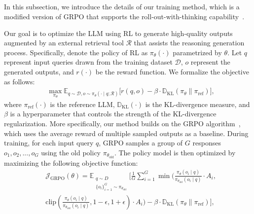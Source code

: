 \subsection{\RLName}
In this subsection, we introduce the details of our training method, which is a modified version of GRPO that supports the roll-out-with-thinking capability~\cite{song2025r1searcher}.

Our goal is to optimize the LLM using RL to generate high-quality outputs augmented by an external retrieval tool $\mathcal{R}$ that assists the reasoning generation process. Specifically, denote the policy of RL as $\pi_{\theta}(\cdot)$ parametrized by $\theta$. Let $q$ represent input queries drawn from the training dataset $\mathcal{D}$, $o$ represent the generated outputs, and $r(\cdot)$ be the reward function. We formalize the objective as follows:
\begin{equation}
\begin{aligned}
&\max_{\pi_{\theta}} \mathbb{E}_{q \sim \mathcal{D}, o \sim \pi_{\theta}(\cdot \mid q;\mathcal{R})} 
\big[ r(q,o) - 
\beta \cdot \mathbb{D}_{\text{KL}}(\pi_\theta  \|  \pi_{\text{ref}}) 
\big] ,
\end{aligned}
\end{equation}
where $\pi_{\text{ref}}(\cdot)$ is the reference LLM, $\mathbb{D}_{\text{KL}}(\cdot)$ is the KL-divergence measure, and $\beta$ is a hyperparameter that controls the strength of the KL-divergence regularization. More specifically, our method builds on the GRPO algorithm~\cite{guo2025deepseek}, which uses the average reward of multiple sampled outputs as a baseline. During training, for each input query $q$, GRPO samples a group of $G$ responses ${o_1, o_2,..., o_G}$ using the old policy $\pi_{\theta_{\text{old}}}$. The policy model is then optimized by maximizing the following objective function:
\begin{equation}\label{eq:GRPO}
\begin{aligned}
&\mathcal{J}_{\text{GRPO}}(\theta) = \mathbb{E}_{\substack{q \sim D \\ \{o_i\}_{i=1}^G \sim \pi_{\theta_{\text{old}}}} }
\bigg[ 
 \frac{1}{G} \sum_{i=1}^{G} \min \bigg( 
\frac{\pi_\theta(o_{i}\mid q)}{\pi_{\theta_{\text{old}}}(o_{i} \mid q)} \cdot A_{i}, \\
& \text{clip}\left( \frac{\pi_\theta(o_{i} \mid q)}{\pi_{\theta_{\text{old}}}(o_{i} \mid q )}, 1-\epsilon, 1+\epsilon \right) \cdot A_{i} 
\bigg) 
 - \beta \cdot \mathbb{D}_{\text{KL}}( \pi_\theta  \|  \pi_{\text{ref}} )
\bigg],
\end{aligned}
\end{equation}
